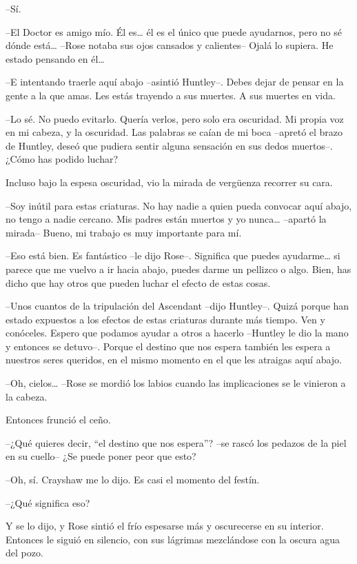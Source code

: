{--Sí.}

{--El Doctor es amigo mío. Él es\ldots{} él es el único que puede
 ayudarnos, pero no sé dónde está\ldots{} --Rose notaba sus ojos cansados
 y calientes-- Ojalá lo supiera. He estado pensando en él\ldots{}}

{--E intentando traerle aquí abajo --asintió Huntley--. Debes dejar de
 pensar en la gente a la que amas. Les estás trayendo a sus muertes. A
sus muertes en vida.}

{--Lo sé. No puedo evitarlo. Quería verlos, pero solo era oscuridad. Mi
 propia voz en mi cabeza, y la oscuridad. Las palabras se caían de mi
 boca --apretó el brazo de Huntley, deseó que pudiera sentir alguna
sensación en sus dedos muertos--. ¿Cómo has podido luchar?}

{Incluso bajo la espesa oscuridad, vio la mirada de vergüenza recorrer
su cara.}

{--Soy inútil para estas criaturas. No hay nadie a quien pueda convocar
 aquí abajo, no tengo a nadie cercano. Mis padres están muertos y yo
 nunca\ldots{} --apartó la mirada-- Bueno, mi trabajo es muy importante
para mí.}

{--Eso está bien. Es fantástico --le dijo Rose--. Significa que puedes
 ayudarme\ldots{} si parece que me vuelvo a ir hacia abajo, puedes darme
 un pellizco o algo. Bien, has dicho que hay otros que pueden luchar el
efecto de estas cosas.}

{--Unos cuantos de la tripulación del Ascendant --dijo Huntley--. Quizá
 porque han estado expuestos a los efectos de estas criaturas durante más
 tiempo. Ven y conóceles. Espero que podamos ayudar a otros a hacerlo
 --Huntley le dio la mano y entonces se detuvo--. Porque el destino que
 nos espera también les espera a nuestros seres queridos, en el mismo
momento en el que les atraigas aquí abajo.}

{--Oh, cielos\ldots{} --Rose se mordió los labios cuando las
implicaciones se le vinieron a la cabeza.}

{Entonces frunció el ceño.}

{--¿Qué quieres decir, ``el destino que nos espera''? --se rascó los
pedazos de la piel en su cuello-- ¿Se puede poner peor que esto?}

{--Oh, sí. Crayshaw me lo dijo. Es casi el momento del festín.}

{--¿Qué significa eso?}

{Y se lo dijo, y Rose sintió el frío espesarse más y oscurecerse en su
 interior. Entonces le siguió en silencio, con sus lágrimas mezclándose
con la oscura agua del pozo.}

